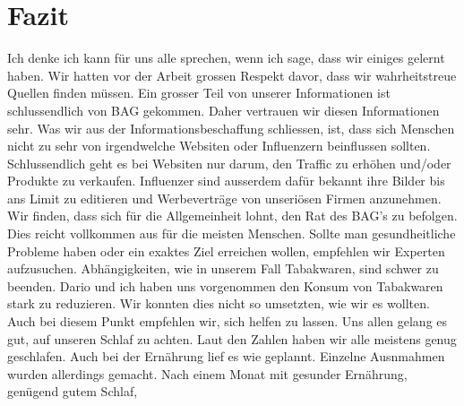 \chapter{Fazit}
Ich denke ich kann für uns alle sprechen, wenn ich sage, dass wir einiges gelernt haben.
\newline
Wir hatten vor der Arbeit grossen Respekt davor, dass wir wahrheitstreue Quellen finden müssen. Ein grosser Teil von unserer Informationen ist schlussendlich von BAG gekommen. Daher vertrauen wir diesen Informationen sehr.
\newline
Was wir aus der Informationsbeschaffung schliessen, ist, dass sich Menschen nicht zu sehr von irgendwelche Websiten oder Influenzern beinflussen sollten. Schlussendlich geht es bei Websiten nur darum, den Traffic zu erhöhen und/oder Produkte zu verkaufen. Influenzer sind ausserdem dafür bekannt ihre Bilder bis ans Limit zu editieren und Werbeverträge von unseriösen Firmen anzunehmen. 
\newline
Wir finden, dass sich für die Allgemeinheit lohnt, den Rat des BAG's zu befolgen. Dies reicht vollkommen aus für die meisten Menschen. Sollte man gesundheitliche Probleme haben oder ein exaktes Ziel erreichen wollen, empfehlen wir Experten aufzusuchen.
\newline
\newline
Abhängigkeiten, wie in unserem Fall Tabakwaren, sind schwer zu beenden. Dario und ich haben uns vorgenommen den Konsum von Tabakwaren stark zu reduzieren. Wir konnten dies nicht so umsetzten, wie wir es wollten. Auch bei diesem Punkt empfehlen wir, sich helfen zu lassen.
\newline
Uns allen gelang es gut, auf unseren Schlaf zu achten. Laut den Zahlen haben wir alle meistens genug geschlafen. Auch bei der Ernährung lief es wie geplannt. Einzelne Ausnmahmen wurden allerdings gemacht.
\newline
\newline
Nach einem Monat mit gesunder Ernährung, genügend gutem Schlaf, 